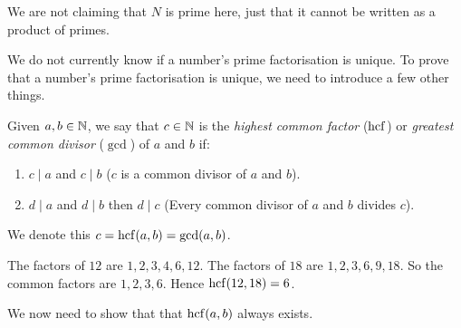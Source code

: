 \documentclass[../main.tex]{subfiles}
\begin{document}
\begin{remark}[Note]
  We are not claiming that $N$ is prime here, just that it cannot be written as a product of primes.
\end{remark}
We do not currently know if a number's prime factorisation is unique.
To prove that a number's prime factorisation is unique, we need to introduce a few other things.
\begin{definition}
  Given $a, b \in \mathbb{N}$, we say that $c \in \mathbb{N}$ is the \textit{highest common factor} ($\operatorname{hcf}$) or \textit{greatest common divisor} ($\gcd$) of $a$ and $b$ if:
  \begin{enumerate}
    \item $c \mid a$ and $c \mid b$ ($c$ is a common divisor of $a$ and $b$).
    \item $d \mid a$ and $d \mid b$ then $d \mid c$ (Every common divisor of $a$ and $b$ divides $c$).
  \end{enumerate}
  We denote this $c = \operatorname{hcf}(a, b) = \gcd(a, b)$.
\end{definition}
\begin{example}
  The factors of $12$ are $1, 2, 3, 4, 6, 12$. The factors of $18$ are $1, 2, 3, 6, 9, 18$.
  So the common factors are $1, 2, 3, 6$.
  Hence $\operatorname{hcf}(12, 18) = 6$.
\end{example}
We now need to show that that $\operatorname{hcf}(a, b)$ always exists.
\end{document}

